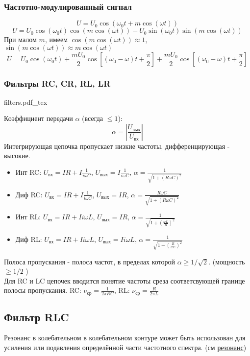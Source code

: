 \documentclass{article}
\newcommand{\incfig}[2][1]{%
    \def\svgwidth{#1\columnwidth}
    {#2.pdf_tex}
}
\begin{document}
\subsubsection{Частотно-модулированный сигнал}
\[U=U_0\cos(\omega_0 t + m\cos(\omega t))\]
\[U=U_0\cos(\omega_0 t)\cos(m\cos(\omega t))-U_0\sin(\omega_0 t)\sin(m\cos(\omega t))\]
При малом $m$, имеем $\cos(m\cos(\omega t)) \approx 1$, $\sin(m\cos(\omega t)) \approx m\cos(\omega t)$
\[U=U_0\cos(\omega_0 t) + \frac{mU_0}{2}\cos[(\omega_0-\omega)t+\frac{\pi}{2}] + \frac{mU_0}{2}\cos[(\omega_0+\omega)t+\frac{\pi}{2}] \]
\subsubsection{Фильтры RC, CR, RL, LR}
\incfig{filters}
Коэффициент передачи $\alpha$ (всегда $\le 1$):
\[\alpha=|\frac{U_{\text{вых}}}{U_{\text{вх}}}|\]
Интегрирующая цепочка пропускает низкие частоты, дифференцирующая - высокие.
\begin{itemize}
    \item Инт RC: $U_{\text{вх}}=IR+I\frac{1}{i\omega C}$, $U_{\text{вых}}=I\frac{1}{i\omega C}$, $\alpha=\frac{1}{\sqrt{1+(R\omega C)^2}}$
    \item Диф RC: $U_{\text{вх}}=IR+I\frac{1}{i\omega C}$, $U_{\text{вых}}=IR$, $\alpha=\frac{R\omega C}{\sqrt{1+(R\omega C)^2}}$
    \item Инт RL: $U_{\text{вх}}=IR+Ii\omega L$, $U_{\text{вых}}=IR$, $\alpha=\frac{1}{\sqrt{1+(\frac{\omega L}{R})^2}}$
    \item Диф RL: $U_{\text{вх}}=IR+Ii\omega L$, $U_{\text{вых}}=Ii\omega L$, $\alpha=\frac{1}{\sqrt{1+(\frac{R}{\omega L})^2}}$
\end{itemize}
Полоса пропускания - полоса частот, в пределах которой $\alpha \ge 1/\sqrt2$. (мощность $\ge 1/2$ )\\
Для RC и LC цепочек вводится понятие частоты среза соответсвующей границе полосы пропускания. RC: $\nu_{\text{ср}}=\frac{1}{2\pi RC}$, RL: $\nu_{\text{ср}}=\frac{R}{2\pi L}$
\subsection{Фильтр RLC}
Резонанс в колебательном в колебательном контуре может быть использован для усиления или подавления определённой части частотного спектра. (см \hyperref[sec:resonance]{резонанс})
\end{document}
